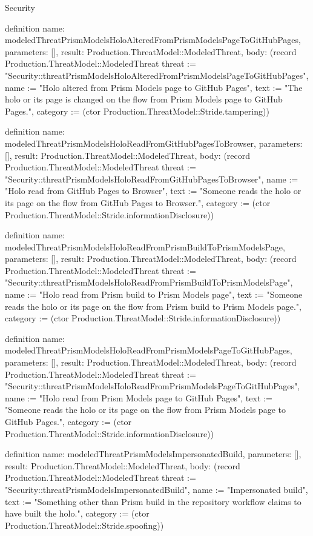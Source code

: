 \begin{lexlean}{Security}
\begin{semanticmodule}
definition{
  name: modeledThreatPrismModelsHoloAlteredFromPrismModelsPageToGitHubPages,
  parameters: [],
  result: Production.ThreatModel::ModeledThreat,
  body: (record Production.ThreatModel::ModeledThreat {threat := "Security::threatPrismModelsHoloAlteredFromPrismModelsPageToGitHubPages", name := "Holo altered from Prism Models page to GitHub Pages", text := "The holo or its page is changed on the flow from Prism Models page to GitHub Pages.", category := (ctor Production.ThreatModel::Stride.tampering)})
}

definition{
  name: modeledThreatPrismModelsHoloReadFromGitHubPagesToBrowser,
  parameters: [],
  result: Production.ThreatModel::ModeledThreat,
  body: (record Production.ThreatModel::ModeledThreat {threat := "Security::threatPrismModelsHoloReadFromGitHubPagesToBrowser", name := "Holo read from GitHub Pages to Browser", text := "Someone reads the holo or its page on the flow from GitHub Pages to Browser.", category := (ctor Production.ThreatModel::Stride.informationDisclosure)})
}

definition{
  name: modeledThreatPrismModelsHoloReadFromPrismBuildToPrismModelsPage,
  parameters: [],
  result: Production.ThreatModel::ModeledThreat,
  body: (record Production.ThreatModel::ModeledThreat {threat := "Security::threatPrismModelsHoloReadFromPrismBuildToPrismModelsPage", name := "Holo read from Prism build to Prism Models page", text := "Someone reads the holo or its page on the flow from Prism build to Prism Models page.", category := (ctor Production.ThreatModel::Stride.informationDisclosure)})
}

definition{
  name: modeledThreatPrismModelsHoloReadFromPrismModelsPageToGitHubPages,
  parameters: [],
  result: Production.ThreatModel::ModeledThreat,
  body: (record Production.ThreatModel::ModeledThreat {threat := "Security::threatPrismModelsHoloReadFromPrismModelsPageToGitHubPages", name := "Holo read from Prism Models page to GitHub Pages", text := "Someone reads the holo or its page on the flow from Prism Models page to GitHub Pages.", category := (ctor Production.ThreatModel::Stride.informationDisclosure)})
}

definition{
  name: modeledThreatPrismModelsImpersonatedBuild,
  parameters: [],
  result: Production.ThreatModel::ModeledThreat,
  body: (record Production.ThreatModel::ModeledThreat {threat := "Security::threatPrismModelsImpersonatedBuild", name := "Impersonated build", text := "Something other than Prism build in the repository workflow claims to have built the holo.", category := (ctor Production.ThreatModel::Stride.spoofing)})
}


\end{semanticmodule}
\end{lexlean}
